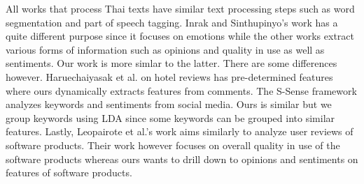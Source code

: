 All works that process Thai texts have similar text processing steps such as word segmentation and part of speech tagging. Inrak and Sinthupinyo's work \cite{emotioninthai} has a quite different purpose since it focuses on emotions while the other works \cite{thaiopinionmininghotel,ssense,ssense2,Leopairote1,Leopairote2} extract various forms of information such as opinions and quality in use as well as sentiments. Our work is more simlar to the latter. There are some differences however. Haruechaiyasak et al. \cite{thaiopinionmininghotel} on hotel reviews has pre-determined features where ours dynamically extracts features from comments. The S-Sense framework \cite{ssense} analyzes keywords and sentiments from social media. Ours is similar but we group keywords using LDA since some keywords can be grouped into similar features. Lastly, Leopairote et al.'s work \cite{Leopairote1, Leopairote2} aims similarly to analyze user reviews of software products. Their work however focuses on overall quality in use of the software products whereas ours wants to drill down to opinions and sentiments on features of software products.



